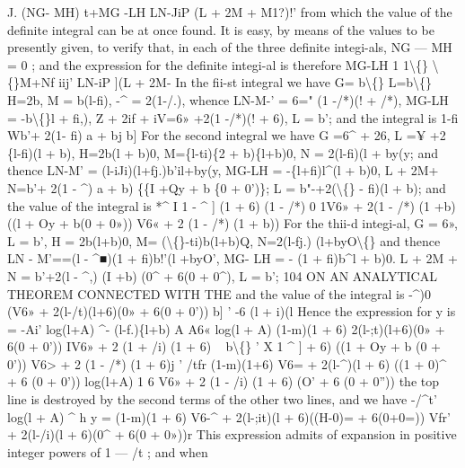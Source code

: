 \documentclass[11pt,a4paper]{book}
\begin{document}
J.  (NG-  MH)  t+MG  -LH
LN-JiP  (L  +  2M  +  M1?)!'
from  which  the  value  of  the  definite  integral  can  be  at  once  found.  It  is  easy,  by
means  of  the  values  to  be  presently  given,  to  verify  that,  in  each  of  the  three  definite
integi-als,  NG  —  MH  =  0  ;  and  the  expression  for  the  definite  integi-al  is  therefore
MG-LH
1  1\textbackslash\{\}
\textbackslash\{\}M+Nf     iij'
LN-iP  ](L  +  2M-
In   the   fii-st   integral   we   have
G=   b\textbackslash\{\}       L=b\textbackslash\{\}
H=2b,      M  =  b(l-fi),
-^  =  2(1-/.),
whence
LN-M-'      =  6="  (1 -/*)(!  +  /*),  MG-LH  =  -b\textbackslash\{\}l  +  fi,),
Z  +  2if  +  iV=6» +2(1 -/*)(!  + 6),  L  =  b';
and  the   integral  is
1-fi  Wb'+ 2(1- fi) a +  bj  b]
For  the   second   integral  we   have
G  =6^  +  26,  L  =¥  +2  \{l-fi)(l  +  b),
H=2b(l  +  b)0,    M=\{l-ti)\{2  +  b)\{l+b)0,
N  =  2(l-fi)(l  +  by(y;
and   thence
LN-M'  =  (l-iJi)(l+fj.)b'il+by(y,  MG-LH  =  -\{l+fi)l^(l  +  b)0,
L  +  2M+ N=b'+ 2(1  -  ^)  a +  b)  \{\{I +Qy  +  b  \{0  +  0')\};     L  =  b"-+2(\textbackslash\{\}  -  fi)(l  +  b);
and   the   value   of  the   integral   is
*^   I    1  -  ^  ]
(1  +  6)  (1  -  /*)  0  1V6»  +  2(1  -  /*)  (1  +b)((l  +  Oy  +  b(0  +  0»))     V6«  +  2  (1  -  /*)  (1  +  b))
For   the   thii-d   integi-al,
G  =  6»,  L  =  b',
H  =  2b(l+b)0,    M=    (\textbackslash\{\}-ti)b(l+b)Q,
N=2(l-fj.)    (l+byO\textbackslash\{\}
and   thence
LN - M'==(l  -  ^■)(1  +  fi)b!'(l  +byO',  MG-  LH  =  -  (1  +  fi)b^l  +  b)0.
L  +  2M  +  N  =  b'+2(l  - ^,) (I  +b)  (0^  +  6(0  +  0^),  L  =  b';
104  ON    AN    ANALYTICAL   THEOREM   CONNECTED    WITH    THE
and  the   value  of  the  integral   is
-^)0  (V6»  +  2(l-/t)(l+6)(0»  +  6(0  +  0'))      b]  '
-6
(l  +  i)(l
Hence  the   expression   for  y   is
=  -Ai'         log(l+A)
^-  (l-f.)\{l+b)         A
A6«  log(l  +  A)
(1-m)(1  +  6)
2(l-;t)(l+6)(0»  +  6(0  +  0'))
IV6»  +  2  (1  +  /i)  (1  +  6)  ~  b\textbackslash\{\}
'
X 1  ^  ]
+  6)  ((1  +  Oy  +  b  (0  +  0'))     V6>  +  2  (1  -  /*)  (1  +  6)j  '
/tfr
(1-m)(1+6)
V6=  +  2(l-^)(l  +  6)  ((1  +  0)^  +  6  (0  +  0'))
log(l+A)
1
6
V6»  +  2  (1  -  /i)  (1  +  6)  (O'  +  6  (0  +  0''))
the  top  line  is  destroyed  by  the  second  terms  of  the  other  two  lines,  and  we  have
-/^t'         log(l  +  A)  ^
h
y  =
(1-m)(1  +  6)
V6-^  +  2(l-;it)(l  +  6)((H-0)=  +  6(0+0=))     Vfr'  +  2(l-/i)(l +  6)(0^  +  6(0  +  0»))r
This  expression  admits  of  expansion  in  positive  integer  powers  of  1  —  /t ;  and  when
\end{document}
